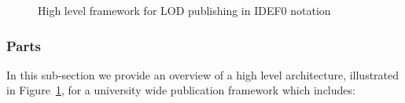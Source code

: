 \begin{figure}[htbp]
\centering
{}
\caption[High level framework for LOD publishing]{High level framework for LOD publishing in IDEF0 notation}
\label{Fi:idef0}
\end{figure}
\subsubsection{Parts}
In this sub-section we provide an overview of a high level architecture, illustrated
in Figure~\ref{Fi:idef0}, for a university wide publication framework which includes:

